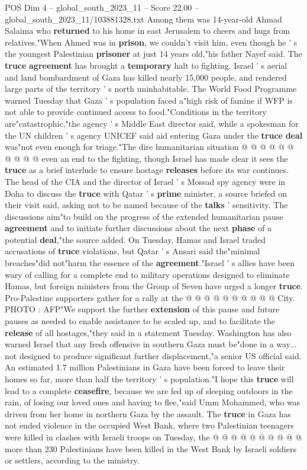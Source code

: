 \begin{textsample}{POS Dim 4 – global\_south\_2023\_11 – Score 22.00 – global\_south\_2023\_11/103881328.txt}
Among them was 14-year-old Ahmad Salaima who \textbf{returned} to his home in east Jerusalem to cheers and hugs from relatives."When Ahmed was in \textbf{prison}, we couldn't visit him, even though he ' s the youngest Palestinian \textbf{prisoner} at just 14 years old,"his father Nayef said.
The \textbf{truce} \textbf{agreement} has brought a \textbf{temporary} halt to fighting.
Israel ' s aerial and land bombardment of Gaza has killed nearly 15,000 people, and rendered large parts of the territory ' s north uninhabitable.
The World Food Programme warned Tuesday that Gaza ' s population faced a"high risk of famine if WFP is not able to provide continued access to food."Conditions in the territory are"catastrophic,"the agency ' s Middle East director said, while a spokesman for the UN children ' s agency UNICEF said aid entering Gaza under the \textbf{truce} \textbf{deal} was"not even enough for triage."The dire humanitarian situation @ @ @ @ @ @ @ @ @ @ even an end to the fighting, though Israel has made clear it sees the \textbf{truce} as a brief interlude to ensure hostage \textbf{releases} before its war continues.
The head of the CIA and the director of Israel ' s Mossad spy agency were in Doha to discuss the \textbf{truce} with Qatar ' s \textbf{prime} minister, a source briefed on their visit said, asking not to be named because of the \textbf{talks} ' sensitivity.
The discussions aim"to build on the progress of the extended humanitarian pause \textbf{agreement} and to initiate further discussions about the next \textbf{phase} of a potential \textbf{deal},"the source added.
On Tuesday, Hamas and Israel traded accusations of \textbf{truce} violations, but Qatar ' s Ansari said the"minimal breaches"did not"harm the essence of the \textbf{agreement}."Israel ' s allies have been wary of calling for a complete end to military operations designed to eliminate Hamas, but foreign ministers from the Group of Seven have urged a longer \textbf{truce}.
Pro-Palestine supporters gather for a rally at the @ @ @ @ @ @ @ @ @ @ City.
PHOTO : AFP"We support the further \textbf{extension} of this pause and future pauses as needed to enable assistance to be scaled up, and to facilitate the \textbf{release} of all hostages,"they said in a statement Tuesday.
Washington has also warned Israel that any fresh offensive in southern Gaza must be"done in a way... not designed to produce significant further displacement,"a senior US official said.
An estimated 1.7 million Palestinians in Gaza have been forced to leave their homes so far, more than half the territory ' s population."I hope this \textbf{truce} will lead to a complete \textbf{ceasefire}, because we are fed up of sleeping outdoors in the rain, of losing our loved ones and having to flee,"said Umm Mohammed, who was driven from her home in northern Gaza by the assault.
The \textbf{truce} in Gaza has not ended violence in the occupied West Bank, where two Palestinian teenagers were killed in clashes with Israeli troops on Tuesday, the @ @ @ @ @ @ @ @ @ @ more than 230 Palestinians have been killed in the West Bank by Israeli soldiers or settlers, according to the ministry.


\end{textsample}
